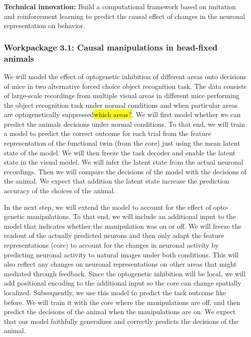 \documentclass[B2,COG]{ercgrant}
\begin{document}
\textbf{Technical innovation:} 
Build a computational framework based on imitation and reinforcement learning to predict the causal effect of changes in the neuronal representation on behavior. 

\subsubsection{Workpackage 3.1: Causal manipulations in head-fixed animals\hfill{}}
We will model the effect of optogenetic inhibition of different areas onto decisions of mice in two alternative forced choice object recognition task. 
The data consists of large-scale recordings from multiple visual areas in different mice performing the object recognition task under normal conditions and when particular areas are optogenetically suppressed\hl{which areas?}.
We will first model whether we can predict the animals decisions under normal conditions. 
To that end, we will train a model to predict the correct outcome for each trial from the feature representation of the functional twin (from the core) just using the mean latent state of the model.
We will then freeze the task decoder and enable the latent state in the visual model. 
We will infer the latent state from the actual neuronal recordings.
Then we will compare the decisions of the model with the decisions of the animal. 
We expect that addition the latent state increase the prediction accuracy of the choices of the animal. 

In the next step, we will extend the model to account for the effect of opto-genetic manipulations. 
To that end, we will include an additional input to the model that indicates whether the manipulation was on or off. 
We will freeze the readout of the actually predicted neurons and then only adapt the feature representations (core) to account for the changes in neuronal activity by predicting neuronal activity to natural images under both conditions.
This will also reflect any changes on neuronal representations on other areas that might mediated through feedback. 
Since the optogenetic inhibition will be local, we will add positional encoding to the additional input so the core can change spatially localized. 
Subsequently, we use this model to predict the task outcome like before.
We will train it with the core where the manipulations are off, and then predict the decisions of the animal when the manipulations are on.
We expect that our model faithfully generalizes and correctly predicts the decisions of the animal. 
\end{document}
